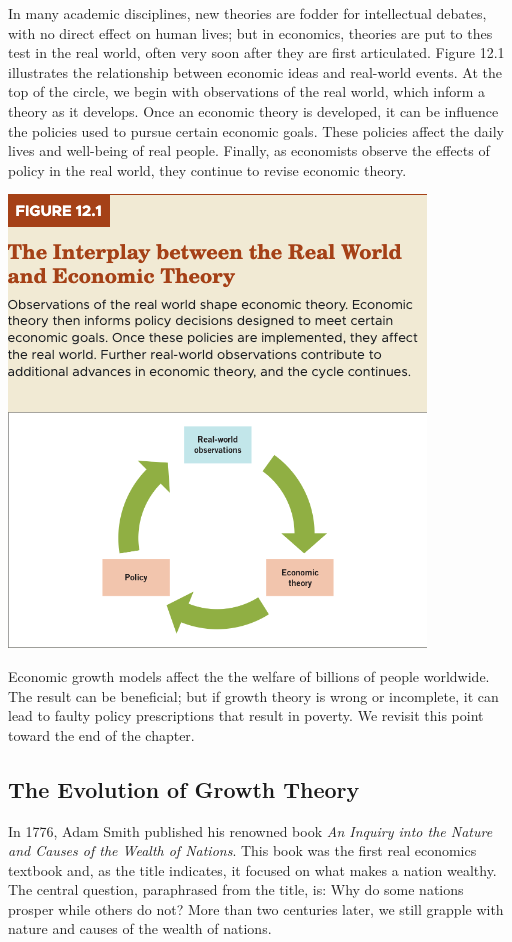 \documentclass[11pt]{article} %
\begin{document}
In many academic disciplines, new theories are fodder for intellectual debates, with no direct effect on human lives; but in economics, theories are put to thes test in the real world, often very soon after they are first articulated. Figure 12.1 illustrates the relationship between economic ideas and real-world events. At the top of the circle, we begin with observations of the real world, which inform a theory as it develops. Once an economic theory is developed, it can be influence the policies used to pursue certain economic goals. These policies affect the daily lives and well-being of real people. Finally, as economists observe the effects of policy in the real world, they continue to revise economic theory.
\begin{center}
\includegraphics[scale=0.5]{Images/Figure 12.1.png}
\end{center}
Economic growth models affect the the welfare of billions of people worldwide. The result can be beneficial; but if growth theory is wrong or incomplete, it can lead to faulty policy prescriptions that result in poverty. We revisit this point toward the end of the chapter.
\subsection*{The Evolution of Growth Theory}
In 1776, Adam Smith published his renowned book \textit{An Inquiry into the Nature and Causes of the Wealth of Nations}. This book was the first real economics textbook and, as the title indicates, it focused on what makes a nation wealthy. The central question, paraphrased from the title, is: Why do some nations prosper while others do not? More than two centuries later, we still grapple with nature and causes of the wealth of nations.
\end{document}

